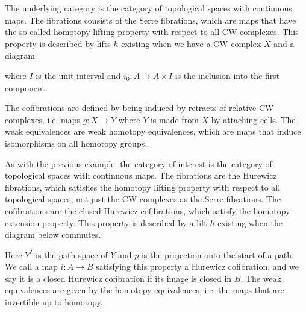 \begin{example}
The underlying category is the category of topological spaces with continuous maps. The fibrations consists of the Serre fibrations, which are maps that have the so called homotopy lifting property with respect to all CW complexes. This property is described by lifts $h$ existing when we have a CW complex $X$ and a diagram
\begin{center}
\end{center}
where $I$ is the unit interval and $i_0:A\longrightarrow A\times I$ is the inclusion into the first component. 

The cofibrations are defined by being induced by retracts of relative CW complexes, i.e. maps $g:X\longrightarrow Y$ where $Y$ is made from $X$ by attaching cells. The weak equivalences are weak homotopy equivalences, which are maps that induce isomorphisms on all homotopy groups. 
\end{example}

\begin{example}
As with the previous example, the category of interest is the category of topological spaces with continuous maps. The fibrations are the Hurewicz fibrations, which satisfies the homotopy lifting property with respect to all topological spaces, not just the CW complexes as the Serre fibrations. The cofibrations are the closed Hurewicz cofibrations, which satisfy the homotopy extension property. This property is described by a lift $h$ existing when the diagram below commutes.

\begin{center}
\end{center}

Here $Y^I$ is the path space of $Y$ and $p$ is the projection onto the start of a path. We call a map $i:A\longrightarrow B$ satisfying this property a Hurewicz cofibration, and we say it is a closed Hurewicz cofibration if its image is closed in $B$. The weak equivalences are given by the homotopy equivalences, i.e. the maps that are invertible up to homotopy.  
\end{example}

